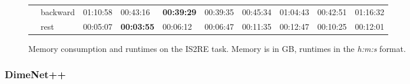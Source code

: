 \begin{figure}[H]
{\begin{tabular}{ll|l|l|l|l|l|l|l|l|}
    \multicolumn{1}{|l|}{}                          & backward    & 01:10:58 & 00:43:16          & \textbf{00:39:29} & 00:39:35       & 00:45:34 & 01:04:43       & 00:42:51          & 01:16:32    \\ \cline{2-10} 
    \multicolumn{1}{|l|}{}                          & rest        & 00:05:07 & \textbf{00:03:55} & 00:06:12          & 00:06:47       & 00:11:35 & 00:12:47       & 00:10:25          & 00:12:01    \\ \hline
    \end{tabular}}

    \captionsetup{width=\dimexpr\textwidth-1.5cm\relax}
    \caption{Memory consumption and runtimes on the IS2RE task. 
    Memory is in GB, runtimes in the \textit{h:m:s} format.}
    \label{fig:gemnet-is2re}
    
\end{figure}

\subsubsection{DimeNet++}

